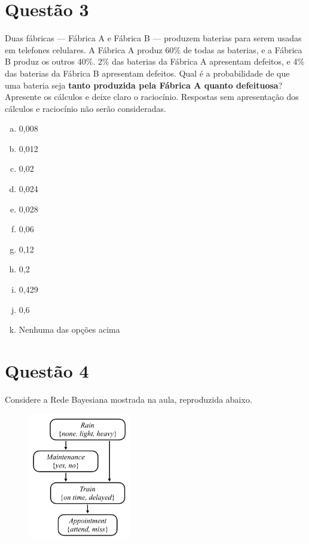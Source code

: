 \documentclass[a4paper,12pt]{article}
\begin{document}
\section*{Questão 3}

Duas fábricas — Fábrica A e Fábrica B — produzem baterias para serem usadas em telefones celulares. A Fábrica A produz 60\% de todas as baterias, e a Fábrica B produz os outros 40\%. 2\% das baterias da Fábrica A apresentam defeitos, e 4\% das baterias da Fábrica B apresentam defeitos. Qual é a probabilidade de que uma bateria seja \textbf{tanto produzida pela Fábrica A quanto defeituosa}? Apresente os cálculos e deixe claro o raciocínio. Respostas sem apresentação dos cálculos e raciocínio não serão consideradas.

\begin{multicols}{3}
\begin{enumerate}[a)]
    \item 0,008
    \item 0,012
    \item 0,02
    \item 0,024
    \item 0,028
    \item 0,06
    \item 0,12
    \item 0,2
    \item 0,429
    \item 0,6
    \item Nenhuma das opções acima
\end{enumerate}
\end{multicols}

\pagebreak

\section*{Questão 4}

Considere a Rede Bayesiana mostrada na aula, reproduzida abaixo.

\begin{figure}[!ht]
    \centering
    \includegraphics[width=0.4\textwidth]{bayesiannet.jpg}
\end{figure}
\end{document}
